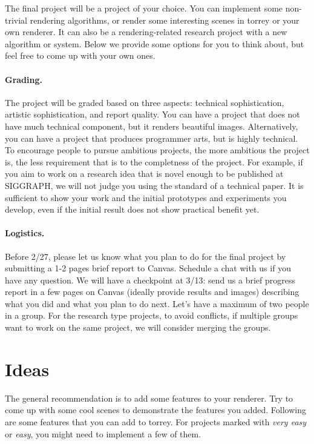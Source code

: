 




The final project will be a project of your choice. You can implement some non-trivial rendering algorithms, or render some interesting scenes in torrey or your own renderer. It can also be a rendering-related research project with a new algorithm or system. 
Below we provide some options for you to think about, but feel free to come up with your own ones.

\paragraph{Grading.} 
The project will be graded based on three aspects: technical sophistication, artistic sophistication, and report quality.
You can have a project that does not have much technical component, but it renders beautiful images.
Alternatively, you can have a project that produces programmer arts, but is highly technical. 
To encourage people to pursue ambitious projects, the more ambitious the project is, the less requirement that is to the completness of the project. 
For example, if you aim to work on a research idea that is novel enough to be published at SIGGRAPH, we will not judge you using the standard of a technical paper.
It is sufficient to show your work and the initial prototypes and experiments you develop, even if the initial result does not show practical benefit yet.

\paragraph{Logistics.}
Before 2/27, please let us know what you plan to do for the final project by submitting a 1-2 pages brief report to Canvas.
Schedule a chat with us if you have any question. 
We will have a checkpoint at 3/13: send us a brief progress report in a few pages on Canvas (ideally provide results and images) describing what you did and what you plan to do next.
Let's have a maximum of two people in a group. 
For the research type projects, to avoid conflicts, if multiple groups want to work on the same project, we will consider merging the groups. 

\section{Ideas}

The general recommendation is to add some features to your renderer. Try to come up with some cool scenes to demonstrate the features you added. Following are some features that you can add to torrey. For projects marked with \emph{very easy} or \emph{easy}, you might need to implement a few of them.

